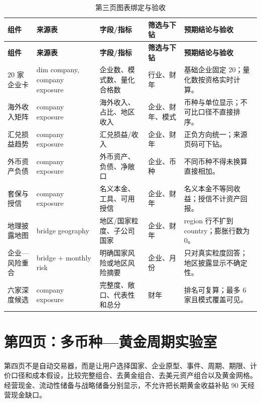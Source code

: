 \documentclass[UTF8,fontset=windows,12pt,openany]{ctexbook}
\begin{document}
\clearpage
\begin{landscape}
\begin{longtable}{p{3.3cm}p{3.5cm}p{4.5cm}p{3.1cm}p{4.5cm}}
\caption{第三页图表绑定与验收}\label{tab:page3-map}\\
\toprule
\textbf{组件} & \textbf{来源表} & \textbf{字段/指标} & \textbf{筛选与下钻} & \textbf{预期结论与验收}\\
\midrule
\endfirsthead
\toprule \textbf{组件} & \textbf{来源表} & \textbf{字段/指标} & \textbf{筛选与下钻} & \textbf{预期结论与验收}\\ \midrule
\endhead
20 家企业卡 & dim company, company exposure & 企业数、模式数、量化合格数 & 行业、财年 & 基础企业固定 20；量化数按资格实时计算。\\
海外收入矩阵 & company exposure & 海外收入、占比、地区收入 & 企业、财年、模式 & 币种与单位显示；不可比口径不直接排序。\\
汇兑损益趋势 & company exposure & 汇兑损益/收入 & 企业、财年 & 正负方向统一；来源页码可下钻。\\
外币资产负债 & company exposure & 外币资产、负债、净敞口 & 企业、币种 & 不同币种不得未换算直接相加。\\
套保与授信 & company exposure & 名义本金、工具、可用授信 & 企业、财年 & 名义本金不等同收益；授信不计资产回报。\\
地理披露地图 & bridge geography & 地区/国家粒度、子公司国家 & 企业、财年 & region 行不扩到 country；膨胀行数为 0。\\
企业—风险重合 & bridge + monthly risk & 明确国家风险或地区风险摘要 & 企业、月份 & 只对真实粒度回答；地区披露显示不确定性。\\
六家深度候选 & company exposure & 完整度、敞口、代表性和总分 & 财年 & 排名可复算；最多 6 家且模式覆盖可见。\\
\bottomrule
\end{longtable}
\end{landscape}

\chapter{第四页：多币种—黄金周期实验室}

第四页不是自动交易器，而是让用户选择国家、企业原型、事件、周期、期限、计价口径和成本假设，比较完整组合、去黄金组合、去美元资产组合以及黄金网格。经营现金、流动性储备与战略储备分别显示，不允许把长期黄金收益补贴 90 天经营现金缺口。
\end{document}
